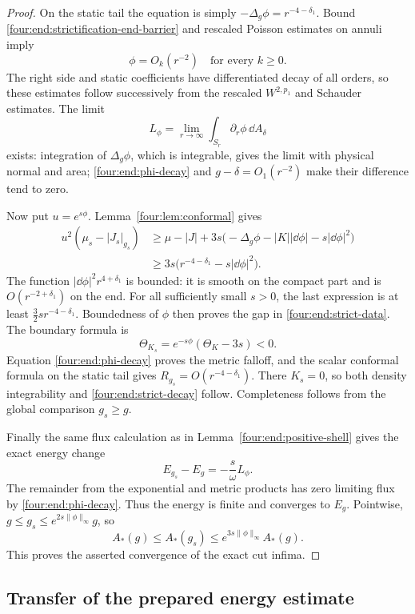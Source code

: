 \begin{proof}
On the static tail the equation is simply
\(-\Delta_g\phi=r^{-4-\delta_1}\). Bound
\eqref{four:end:strictification-end-barrier} and rescaled Poisson estimates
on annuli imply
\begin{equation}\label{four:end:phi-decay}
 \phi=O_k(r^{-2})\quad\text{for every }k\ge0.
\end{equation}
The right side and static coefficients have differentiated decay of
all orders, so these estimates follow successively from the rescaled
\(W^{2,p_1}\) and Schauder estimates. The limit
\[
 L_\phi=\lim_{r\to\infty}\int_{S_r}\partial_r\phi\,\dd A_\delta
\]
exists: integration of \(\Delta_g\phi\), which is integrable, gives
the limit with physical normal and area; \eqref{four:end:phi-decay} and
\(g-\delta=O_1(r^{-2})\) make their difference tend to zero.

Now put \(u=e^{s\phi}\). Lemma~\ref{four:lem:conformal} gives
\begin{align*}
 u^2(\mu_s-|J_s|_{g_s})
 &\ge\mu-|J|+3s\bigl(-\Delta_g\phi
                       -|K||\dd\phi|-s|\dd\phi|^2\bigr)\\
 &\ge3s\bigl(r^{-4-\delta_1}-s|\dd\phi|^2\bigr).
\end{align*}
The function \(|\dd\phi|^2r^{4+\delta_1}\) is bounded: it is smooth
on the compact part and is \(O(r^{-2+\delta_1})\) on the end.
For all sufficiently small \(s>0\), the last expression is at least
\(\frac32s r^{-4-\delta_1}\). Boundedness of \(\phi\) then proves
the gap in \eqref{four:end:strict-data}. The boundary formula is
\[
 \Theta_{K_s}=e^{-s\phi}(\Theta_K-3s)<0.
\]
Equation \eqref{four:end:phi-decay} proves the metric falloff, and the
scalar conformal formula on the static tail gives
\(R_{g_s}=O(r^{-4-\delta_1})\). There \(K_s=0\), so both density
integrability and \eqref{four:end:strict-decay} follow. Completeness follows
from the global comparison \(g_s\ge g\).

Finally the same flux calculation as in Lemma~\ref{four:end:positive-shell}
gives the exact energy change
\[
 E_{g_s}-E_g=-\frac{s}{\omega}L_\phi.
\]
The remainder from the exponential and metric products has zero
limiting flux by \eqref{four:end:phi-decay}. Thus the energy is finite and
converges to \(E_g\). Pointwise,
\(g\le g_s\le e^{2s\|\phi\|_\infty}g\), so
\[
 A_*(g)\le A_*(g_s)
       \le e^{3s\|\phi\|_\infty}A_*(g).
\]
This proves the asserted convergence of the exact cut infima.
\end{proof}

\subsection{Transfer of the prepared energy estimate}

